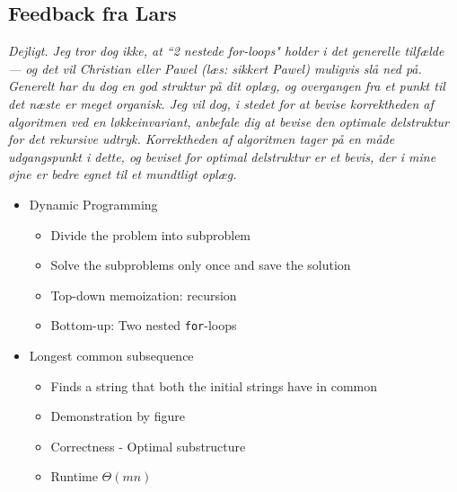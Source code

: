 \subsection*{Feedback fra Lars}
\textit{Dejligt. Jeg tror dog ikke, at “2 nestede for-loops" holder i det
generelle tilfælde — og det vil Christian eller Pawel (læs: sikkert Pawel)
muligvis slå ned på. Generelt har du dog en god struktur på dit oplæg, og
overgangen fra et punkt til det næste er meget organisk. Jeg vil dog, i
stedet for at bevise korrektheden af algoritmen ved en løkkeinvariant,
anbefale dig at bevise den optimale delstruktur for det rekursive udtryk.
Korrektheden af algoritmen tager på en måde udgangspunkt i dette, og
beviset for optimal delstruktur er et bevis, der i mine øjne er bedre
egnet til et mundtligt oplæg.}

\begin{itemize}
    \item Dynamic Programming
    \begin{itemize}
        \item Divide the problem into subproblem
        \item Solve the subproblems only once and save the solution
        \item Top-down memoization: recursion
        \item Bottom-up: Two nested \texttt{for}-loops
    \end{itemize}
    \item Longest common subsequence
    \begin{itemize}
        \item Finds a string that both the initial strings have in common
        \item Demonstration by figure
        \item Correctness - Optimal substructure
        \item Runtime $\Theta(mn)$
    \end{itemize}\iffalse
    \item Perspective - Greedy algorithms
    \begin{itemize}
        \item Optimises in a different way
    \end{itemize}\fi
\end{itemize}
